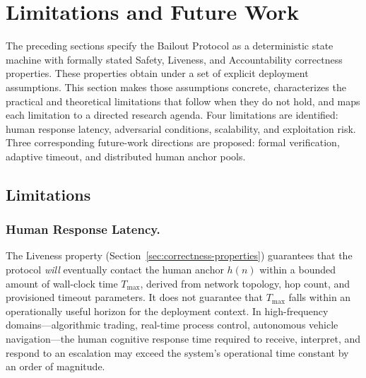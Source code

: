 \section{Limitations and Future Work}\label{sec:limitations}

The preceding sections specify the Bailout Protocol as a deterministic state machine with formally stated Safety, Liveness, and Accountability correctness properties. These properties obtain under a set of explicit deployment assumptions. This section makes those assumptions concrete, characterizes the practical and theoretical limitations that follow when they do not hold, and maps each limitation to a directed research agenda. Four limitations are identified: human response latency, adversarial conditions, scalability, and exploitation risk. Three corresponding future-work directions are proposed: formal verification, adaptive timeout, and distributed human anchor pools.

\subsection{Limitations}

\subsubsection{Human Response Latency.}\label{sec:lim-latency}

The Liveness property (Section~\ref{sec:correctness-properties}) guarantees that the protocol \emph{will} eventually contact the human anchor $h(n)$ within a bounded amount of wall-clock time $T_{\max}$, derived from network topology, hop count, and provisioned timeout parameters. It does not guarantee that $T_{\max}$ falls within an operationally useful horizon for the deployment context. In high-frequency domains---algorithmic trading, real-time process control, autonomous vehicle navigation---the human cognitive response time required to receive, interpret, and respond to an escalation may exceed the system's operational time constant by an order of magnitude.

